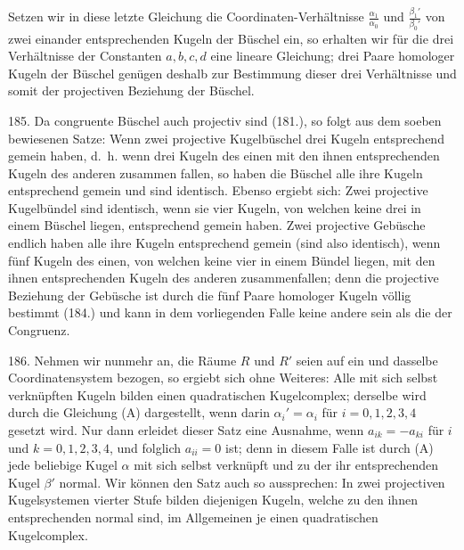 Setzen wir in diese letzte Gleichung die Coordinaten-Verh\"altnisse
$\frac{\alpha_1}{\alpha_0}$ und $\frac{\beta_1'}{\beta_0'}$ von zwei einander entsprechenden
Kugeln der B\"uschel ein, so erhalten wir f\"ur die drei Verh\"altnisse
der Constanten $a, b, c, d$ eine lineare Gleichung;
drei Paare homologer Kugeln der B\"uschel gen\"ugen deshalb
zur Bestimmung dieser drei Verh\"altnisse und somit der projectiven
Beziehung der B\"uschel.

185. Da congruente B\"uschel auch projectiv sind (181.),
so folgt aus dem soeben bewiesenen Satze: Wenn zwei projective
Kugelb\"uschel drei Kugeln {\glqq}entsprechend gemein{\grqq} haben,
d.~h. wenn drei Kugeln des einen mit den ihnen entsprechenden
Kugeln des anderen zusammen fallen, so haben die B\"uschel
alle ihre Kugeln entsprechend gemein und sind identisch.
Ebenso ergiebt sich: Zwei projective Kugelb\"undel
sind identisch, wenn sie vier Kugeln, von welchen keine drei
in einem B\"uschel liegen, entsprechend gemein haben. Zwei
projective Geb\"usche endlich haben alle ihre Kugeln entsprechend
gemein (sind also identisch), wenn f\"unf Kugeln
des einen, von welchen keine vier in einem B\"undel liegen,
mit den ihnen entsprechenden Kugeln des anderen zusammenfallen;
denn die projective Beziehung der Geb\"usche ist durch die
f\"unf Paare homologer Kugeln v\"ollig bestimmt (184.) und kann in
dem vorliegenden Falle keine andere sein als die der Congruenz.

186. Nehmen wir nunmehr an, die R\"aume $R$ und $R'$
seien auf ein und dasselbe Coordinatensystem bezogen, so
ergiebt sich ohne Weiteres: Alle mit sich selbst verkn\"upften
Kugeln bilden einen quadratischen Kugelcomplex; derselbe
wird durch die Gleichung (A) dargestellt, wenn darin
$\alpha_i'=\alpha_i$ f\"ur $i = 0, 1, 2, 3, 4$ gesetzt wird. Nur dann erleidet
dieser Satz eine Ausnahme, wenn $a_{ik} =-a_{ki}$ f\"ur $i$ und
$k = 0, 1, 2, 3, 4$, und folglich $a_{ii} = 0$ ist; denn in diesem
Falle ist durch (A) jede beliebige Kugel $\alpha$ mit sich selbst
verkn\"upft und zu der ihr entsprechenden Kugel $\beta'$ normal.
Wir k\"onnen den Satz auch so aussprechen: In zwei projectiven
Kugelsystemen vierter Stufe bilden diejenigen Kugeln,
welche zu den ihnen entsprechenden normal sind, im Allgemeinen
je einen quadratischen Kugelcomplex.

